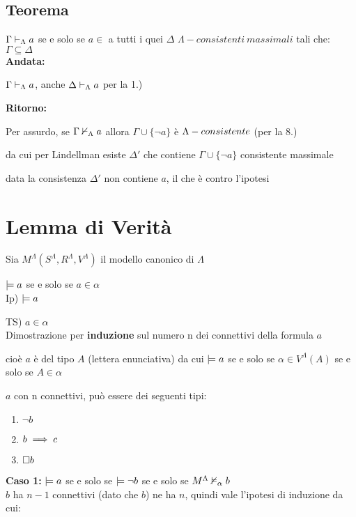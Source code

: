 \subsection{Teorema}

$\Gamma\vdash_{\Lambda}a$ se e solo se $a\in$ a tutti i quei $\Delta$ $\Lambda-consistenti\ massimali$
tali che: $\Gamma\subseteq\Delta$\\


\textbf{Andata:}

$\Gamma\vdash_{\Lambda}a$, anche $\Delta\vdash_{\Lambda}a$ per la 1.)

\textbf{Ritorno:}

Per assurdo, se $\Gamma\nvdash_{\Lambda}a$ allora $\Gamma\cup\{\neg a\}$
è $\mbox{\ensuremath{\Lambda}}-consistente$ (per la 8.)

da cui per Lindellman esiste $\Delta'$ che contiene $\Gamma\cup\{\neg a\}$
consistente massimale

data la consistenza $\Delta'$ non contiene $a$, il che è contro
l'ipotesi \lightning 


\section{Lemma di Verità}

Sia $M^{\Lambda}(S^{\Lambda},R^{\Lambda},V^{\Lambda})$ il modello
canonico di $\Lambda$

$\models a$ se e solo se $a\in\alpha$\\


Ip) $\models a$ 

TS) $a\in\alpha$\\


Dimostrazione per \textbf{induzione} sul numero n dei connettivi della
formula $a$

 cioè $a$ è del tipo $A$ (lettera enunciativa) da
cui $\models a$ se e solo se $\alpha\in V^{\Lambda}(A)$ se e solo
se $A\in\alpha$

 $a$ con n connettivi, può essere
dei seguenti tipi:
\begin{enumerate}
\item $\neg b$
\item $b\implies c$
\item $\square b$
\end{enumerate}
\textbf{Caso 1:} $\models a$ se e solo se $\models\neg b$ se
e solo se $M^{\Lambda}\nvDash_{\alpha}b$\\


$b$ ha $n-1$ connettivi (dato che $b$) ne ha $n$, quindi vale
l'ipotesi di induzione da cui:

